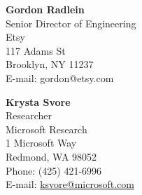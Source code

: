 \documentclass[letter]{article}
\begin{document}
\pagebreak

{\bf Gordon Radlein}
\\
Senior Director of Engineering\\
Etsy\\
117 Adams St\\
Brooklyn, NY 11237\\
E-mail: gordon@etsy.com

\par
\vspace{\baselineskip}
{\bf Krysta Svore}\\
Researcher\\
Microsoft Research\\
1 Microsoft Way\\
Redmond, WA 98052\\
Phone: (425) 421-6996\\
E-mail: \url{ksvore@microsoft.com}\\
\end{document}
